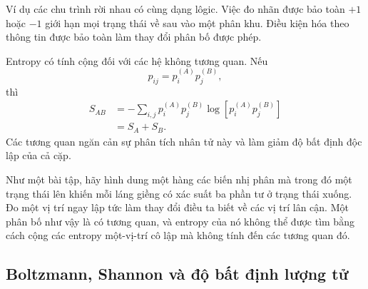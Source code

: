 \begin{classroomqa}
\end{classroomqa}

Ví dụ các chu trình rời nhau có cùng dạng lôgic. Việc đo nhãn được bảo toàn \(+1\) hoặc \(-1\) giới hạn mọi trạng thái về sau vào một phân khu. Điều kiện hóa theo thông tin được bảo toàn làm thay đổi phân bố được phép.

Entropy có tính cộng đối với các hệ không tương quan. Nếu
\begin{equation}
 p_{ij}=p_i^{(A)}p_j^{(B)},
\end{equation}
thì
\begin{align}
 S_{AB}
 &=-\sum_{i,j}p_i^{(A)}p_j^{(B)}
 \log\!\left[p_i^{(A)}p_j^{(B)}\right]\\
 &=S_A+S_B.
 \label{eq:sm1-entropy-additivity}
\end{align}
Các tương quan ngăn cản sự phân tích nhân tử này và làm giảm độ bất định độc lập của cả cặp.

Như một bài tập, hãy hình dung một hàng các biến nhị phân mà trong đó một trạng thái lên khiến mỗi láng giềng có xác suất ba phần tư ở trạng thái xuống. Đo một vị trí ngay lập tức làm thay đổi điều ta biết về các vị trí lân cận. Một phân bố như vậy là có tương quan, và entropy của nó không thể được tìm bằng cách cộng các entropy một-vị-trí cô lập mà không tính đến các tương quan đó.

\subsection{Boltzmann, Shannon và độ bất định lượng tử}

\begin{classroomqa}
\end{classroomqa}

